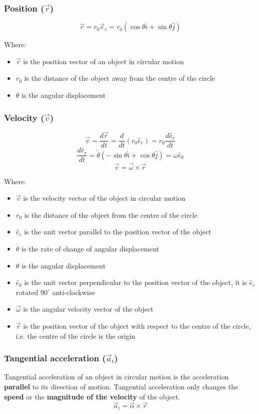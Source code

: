 \documentclass[11pt]{article}
\begin{document}
\subsubsection{Position (\(\vec{r}\))}
\label{sec:orgedbbbfb}
\[\vec{r} = r_0 \vec{e}_r = r_0 (\cos \theta \hat{i} + \sin \theta \hat{j})\]

Where:
\begin{itemize}
\item \(\vec{r}\) is the position vector of an object in circular motion
\item \(r_0\) is the distance of the object away from the centre of the circle
\item \(\theta\) is the angular displacement
\end{itemize}

 \newpage
\subsubsection{Velocity (\(\vec{v}\))}
\label{sec:org9ae4d0f}
\[\vec{v} = \frac{d \vec{r}}{dt} = \frac{d}{dt} (r_0 \hat{e}_r) = r_0 \frac{d \hat{e}_r}{dt}\]
\[\frac{d \hat{e}_r}{dt} = \dot{\theta} (- \sin \theta \hat{i} + \cos \theta \hat{j}) = \omega \hat{e}_{\theta}\]
\[\vec{v} = \vec{\omega} \times \vec{r}\]

Where:
\begin{itemize}
\item \(\vec{v}\) is the velocity vector of the object in circular motion
\item \(r_0\) is the distance of the object from the centre of the circle
\item \(\hat{e}_r\) is the unit vector parallel to the position vector of the object
\item \(\dot{\theta}\) is the rate of change of angular displacement
\item \(\theta\) is the angular displacement
\item \(\hat{e}_{\theta}\) is the unit vector perpendicular to the position vector of the object, it is \(\hat{e}_r\) rotated \(90^{\circ}\) anti-clockwise
\item \(\vec{\omega}\) is the angular velocity vector of the object
\item \(\vec{r}\) is the position vector of the object with respect to the centre of the circle, i.e. the centre of the circle is the origin
\end{itemize}
\subsubsection{Tangential acceleration (\(\vec{a}_t\))}
\label{sec:orgf1c4bd8}
Tangential acceleration of an object in circular motion is the acceleration \textbf{parallel} to its direction of motion. Tangential acceleration only changes the \textbf{speed} or the \textbf{magnitude of the velocity} of the object.
\[\vec{a}_t = \vec{\alpha} \times \vec{r}\]
\end{document}
